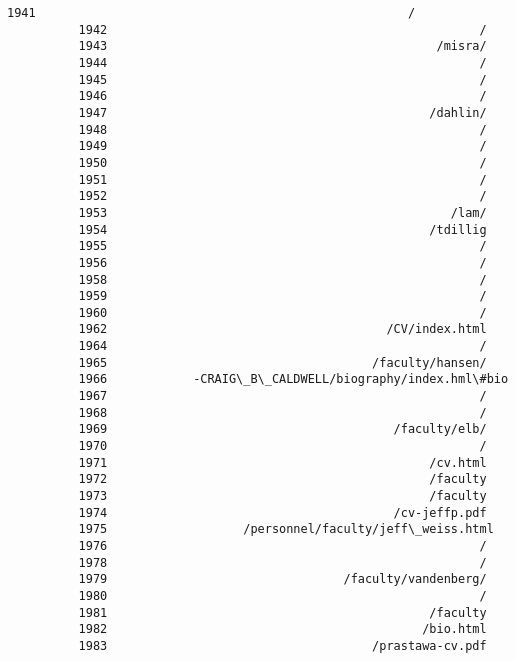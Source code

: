 \documentclass[11pt]{article}
\begin{document}
\begin{Verbatim}[commandchars=\\\{\}]
          1941                                                    /
          1942                                                    /
          1943                                              /misra/
          1944                                                    /
          1945                                                    /
          1946                                                    /
          1947                                             /dahlin/
          1948                                                    /
          1949                                                    /
          1950                                                    /
          1951                                                    /
          1952                                                    /
          1953                                                /lam/
          1954                                             /tdillig
          1955                                                    /
          1956                                                    /
          1958                                                    /
          1959                                                    /
          1960                                                    /
          1962                                       /CV/index.html
          1964                                                    /
          1965                                     /faculty/hansen/
          1966            -CRAIG\_B\_CALDWELL/biography/index.hml\#bio
          1967                                                    /
          1968                                                    /
          1969                                        /faculty/elb/
          1970                                                    /
          1971                                             /cv.html
          1972                                             /faculty
          1973                                             /faculty
          1974                                        /cv-jeffp.pdf
          1975                   /personnel/faculty/jeff\_weiss.html
          1976                                                    /
          1978                                                    /
          1979                                 /faculty/vandenberg/
          1980                                                    /
          1981                                             /faculty
          1982                                            /bio.html
          1983                                     /prastawa-cv.pdf

\end{Verbatim}
\end{document}
